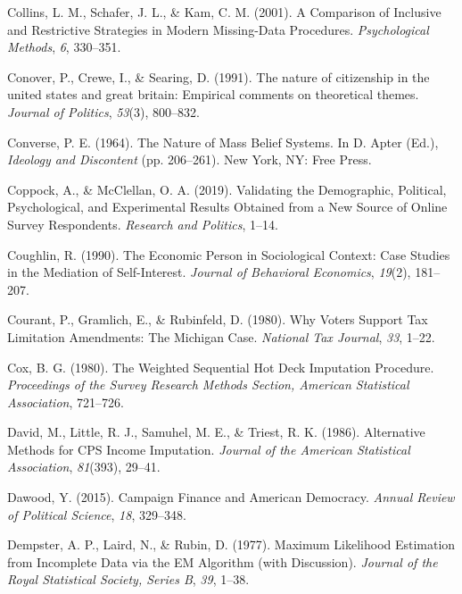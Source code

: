\documentclass[12pt,econ]{sources/authesis}
\begin{document}
\leavevmode\hypertarget{ref-collins_2001_comparison}{}%
Collins, L. M., Schafer, J. L., \& Kam, C. M. (2001). A Comparison of Inclusive and Restrictive Strategies in Modern Missing-Data Procedures. \emph{Psychological Methods}, \emph{6}, 330--351.

\leavevmode\hypertarget{ref-conover_1991_nature}{}%
Conover, P., Crewe, I., \& Searing, D. (1991). The nature of citizenship in the united states and great britain: Empirical comments on theoretical themes. \emph{Journal of Politics}, \emph{53}(3), 800--832.

\leavevmode\hypertarget{ref-converse_nature_1964}{}%
Converse, P. E. (1964). The Nature of Mass Belief Systems. In D. Apter (Ed.), \emph{Ideology and Discontent} (pp. 206--261). New York, NY: Free Press.

\leavevmode\hypertarget{ref-coppock_2019_validating}{}%
Coppock, A., \& McClellan, O. A. (2019). Validating the Demographic, Political, Psychological, and Experimental Results Obtained from a New Source of Online Survey Respondents. \emph{Research and Politics}, 1--14.

\leavevmode\hypertarget{ref-coughlin_economic_1990}{}%
Coughlin, R. (1990). The Economic Person in Sociological Context: Case Studies in the Mediation of Self-Interest. \emph{Journal of Behavioral Economics}, \emph{19}(2), 181--207.

\leavevmode\hypertarget{ref-courant_why_1980}{}%
Courant, P., Gramlich, E., \& Rubinfeld, D. (1980). Why Voters Support Tax Limitation Amendments: The Michigan Case. \emph{National Tax Journal}, \emph{33}, 1--22.

\leavevmode\hypertarget{ref-cox_1980_weighted}{}%
Cox, B. G. (1980). The Weighted Sequential Hot Deck Imputation Procedure. \emph{Proceedings of the Survey Research Methods Section, American Statistical Association}, 721--726.

\leavevmode\hypertarget{ref-david_1986_alternative}{}%
David, M., Little, R. J., Samuhel, M. E., \& Triest, R. K. (1986). Alternative Methods for CPS Income Imputation. \emph{Journal of the American Statistical Association}, \emph{81}(393), 29--41.

\leavevmode\hypertarget{ref-dawood_campaign_2015}{}%
Dawood, Y. (2015). Campaign Finance and American Democracy. \emph{Annual Review of Political Science}, \emph{18}, 329--348.

\leavevmode\hypertarget{ref-dempster_1977_maximum}{}%
Dempster, A. P., Laird, N., \& Rubin, D. (1977). Maximum Likelihood Estimation from Incomplete Data via the EM Algorithm (with Discussion). \emph{Journal of the Royal Statistical Society, Series B}, \emph{39}, 1--38.
\end{document}
